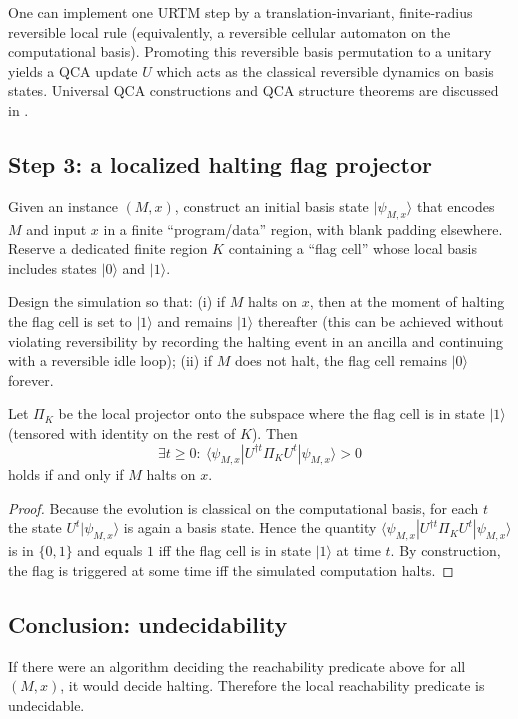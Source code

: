 \noindent One can implement one URTM step by a translation-invariant, finite-radius reversible local rule (equivalently, a reversible cellular automaton on the computational basis).
Promoting this reversible basis permutation to a unitary yields a QCA update $U$ which acts as the classical reversible dynamics on basis states.
Universal QCA constructions and QCA structure theorems are discussed in \cite{Watrous1995,SchumacherWerner2004,ArrighiGrattage2010,ArrighiNesmeWerner2011}.

\subsection{Step 3: a localized halting flag projector}
Given an instance $(M,x)$, construct an initial basis state $|\psi_{M,x}\rangle$ that encodes $M$ and input $x$ in a finite ``program/data'' region, with blank padding elsewhere.
Reserve a dedicated finite region $K$ containing a ``flag cell'' whose local basis includes states $|0\rangle$ and $|1\rangle$.

Design the simulation so that:
(i) if $M$ halts on $x$, then at the moment of halting the flag cell is set to $|1\rangle$ and remains $|1\rangle$ thereafter (this can be achieved without violating reversibility by recording the halting event in an ancilla and continuing with a reversible idle loop);
(ii) if $M$ does not halt, the flag cell remains $|0\rangle$ forever.

Let $\Pi_K$ be the local projector onto the subspace where the flag cell is in state $|1\rangle$ (tensored with identity on the rest of $K$).
Then
\begin{equation}
\exists t\ge 0:\ \langle\psi_{M,x}|U^{\dagger t}\Pi_K U^t|\psi_{M,x}\rangle>0
\end{equation}
holds if and only if $M$ halts on $x$.

\begin{proof}
Because the evolution is classical on the computational basis, for each $t$ the state $U^t|\psi_{M,x}\rangle$ is again a basis state.
Hence the quantity $\langle\psi_{M,x}|U^{\dagger t}\Pi_K U^t|\psi_{M,x}\rangle$ is in $\{0,1\}$ and equals $1$ iff the flag cell is in state $|1\rangle$ at time $t$.
By construction, the flag is triggered at some time iff the simulated computation halts.
\end{proof}

\subsection{Conclusion: undecidability}
If there were an algorithm deciding the reachability predicate above for all $(M,x)$, it would decide halting.
Therefore the local reachability predicate is undecidable.

